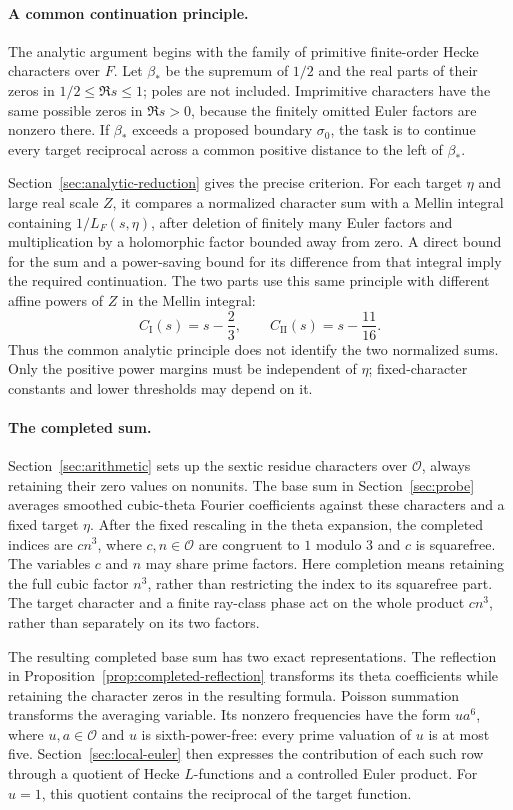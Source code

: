 \documentclass[11pt,a4paper]{article}
\numberwithin{equation}{section}
\numberwithin{figure}{section}
\theoremstyle{definition}
\theoremstyle{remark}
\begin{document}
\paragraph{A common continuation principle.}
The analytic argument begins with the family of primitive finite-order
Hecke characters over $F$. Let $\beta_*$ be the supremum of $1/2$ and the
real parts of their zeros in $1/2\le\Re s\le1$; poles are not included.
Imprimitive characters have the same possible zeros in $\Re s>0$, because
the finitely omitted Euler factors are nonzero there. If $\beta_*$ exceeds
a proposed boundary $\sigma_0$, the task is to continue every target
reciprocal across a common positive distance to the left of $\beta_*$.

Section~\ref{sec:analytic-reduction} gives the precise criterion. For each
target $\eta$ and large real scale $Z$, it compares a normalized character
sum with a Mellin integral containing $1/L_F(s,\eta)$, after deletion of
finitely many Euler factors and multiplication by a holomorphic factor
bounded away from zero. A direct bound for the sum and a power-saving bound
for its difference from that integral imply the required continuation.
The two parts use this same principle with different affine powers of $Z$
in the Mellin integral:
\[
 C_{\mathrm I}(s)=s-\frac23,\qquad
 C_{\mathrm{II}}(s)=s-\frac{11}{16}.
\]
Thus the common analytic principle does not identify the two normalized
sums. Only the positive power margins must be independent of $\eta$;
fixed-character constants and lower thresholds may depend on it.

\paragraph{The completed sum.}
Section~\ref{sec:arithmetic} sets up the sextic residue characters over
$\mathcal O$, always retaining their zero values on nonunits. The base
sum in Section~\ref{sec:probe} averages smoothed cubic-theta Fourier
coefficients against these characters and a fixed target $\eta$.
After the fixed rescaling in the theta expansion, the completed indices
are $cn^3$, where $c,n\in\mathcal O$ are congruent to $1$ modulo $3$ and
$c$ is squarefree. The variables $c$ and $n$ may share prime factors.
Here completion means retaining the full cubic factor $n^3$, rather than
restricting the index to its squarefree part.
The target character and a finite ray-class phase act on the whole product
$cn^3$, rather than separately on its two factors.

The resulting completed base sum has two exact representations.
The reflection in Proposition~\ref{prop:completed-reflection}
transforms its theta coefficients while retaining the character zeros in
the resulting formula.
Poisson summation transforms the averaging variable. Its nonzero frequencies
have the form $ua^6$, where $u,a\in\mathcal O$ and $u$ is sixth-power-free:
every prime valuation of $u$ is at most five.
Section~\ref{sec:local-euler}
then expresses the contribution of each such row through a quotient of
Hecke $L$-functions and a controlled Euler product. For $u=1$, this
quotient contains the reciprocal of the target function.
\end{document}
